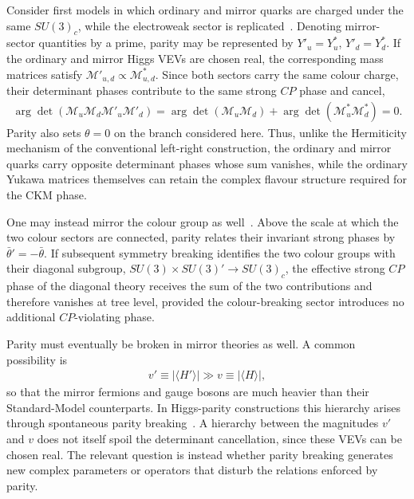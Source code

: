 \documentclass[review]{elsarticle}
\numberwithin{equation}{section}
\numberwithin{table}{section}
\numberwithin{figure}{section}
\def\M{\mathcal{M}}
\begin{document}
Consider first models in which ordinary and mirror quarks are charged under the same $SU(3)_c$, while the electroweak sector is replicated~\cite{Hall:2018let,Dunsky:2019api}. Denoting mirror-sector quantities by a prime, parity may be represented by $Y'_u=Y_u^*$, $Y'_d=Y_d^*$. If the ordinary and mirror Higgs VEVs are chosen real, the corresponding mass matrices satisfy $\M'_{u,d}\propto\M_{u,d}^*$. Since both sectors carry the same colour charge, their determinant phases contribute to the same strong $CP$ phase and cancel,
\begin{align}
    \arg\det \left( \M_u\M_d\M'_u\M'_d \right) 
    = \arg\det(\M_u\M_d) + \arg\det(\M_u^*\M_d^*)
    = 0.
    \label{eq:mirror-determinant-cancellation}
\end{align}
Parity also sets $\theta=0$ on the branch considered here. Thus, unlike the Hermiticity mechanism of the conventional left-right construction, the ordinary and mirror quarks carry opposite determinant phases whose sum vanishes, while the ordinary Yukawa matrices themselves can retain the complex flavour structure required for the CKM phase.

One may instead mirror the colour group as well~\cite{Bonnefoy:2023afx}. Above the scale at which the two colour sectors are connected, parity relates their invariant strong phases by $\bar\theta'=-\bar\theta$. If subsequent symmetry breaking identifies the two colour groups with their diagonal subgroup, $SU(3)\times SU(3)' \rightarrow SU(3)_c$,
the effective strong $CP$ phase of the diagonal theory receives the sum of the two contributions and therefore vanishes at tree level, provided the colour-breaking sector introduces no additional $CP$-violating phase.

Parity must eventually be broken in mirror theories as well. A common possibility is
\begin{align}
    v' \equiv |\langle H'\rangle|
    \gg v \equiv |\langle H\rangle|,
    \label{eq:mirror-parity-breaking}
\end{align}
so that the mirror fermions and gauge bosons are much heavier than their Standard-Model counterparts. In Higgs-parity constructions this hierarchy arises through spontaneous parity breaking~\cite{Hall:2018let,Dunsky:2019api}. A hierarchy between the magnitudes $v'$ and $v$ does not itself spoil the determinant cancellation, since these VEVs can be chosen real. The relevant question is instead whether parity breaking generates new complex parameters or operators that disturb the relations enforced by parity.
\end{document}
